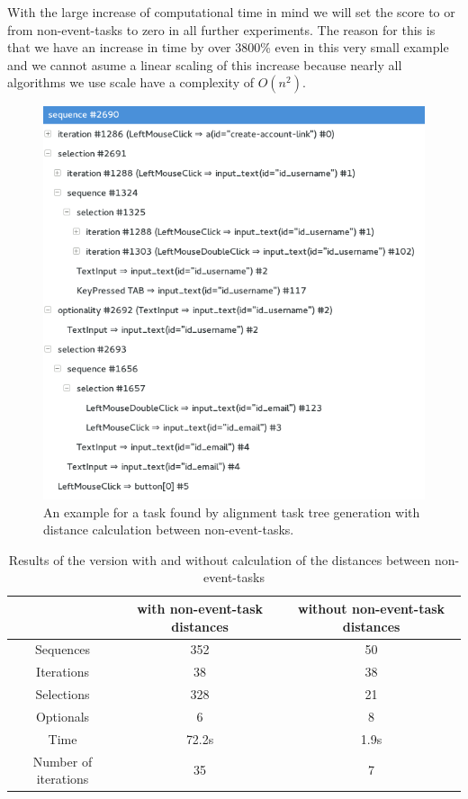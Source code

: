 With the large increase of computational time in mind we will set the score to or from non-event-tasks to zero in all further experiments.
The reason for this is that we have an increase in time by over 3800\% even in this very small example and we cannot asume a linear scaling of this increase because nearly all algorithms we use scale have a complexity of $O(n^2)$.

\begin{figure}[h]
	\centering
	\includegraphics[width=\textwidth]{chapters/casestudy/noneventcreateaccount.png}
	\caption{An example for a task found by alignment task tree generation with distance calculation between non-event-tasks.}
	\label{fig:noneventaccountcreation}
\end{figure}

\begin{table}[h]
	\centering
	\begin{tabular}{|c|c|c|}
		\hline
		& \textbf{with non-event-task distances}& \textbf{without non-event-task distances} \\
		\hline
		Sequences & 352 & 50 \\
		
		Iterations& 38  & 38 \\
		Selections& 328 & 21 \\
		Optionals & 6   & 8  \\
		\hline
		Time      &  72.2s & 1.9s \\
		Number of iterations & 35 & 7\\
		\hline
	\end{tabular}
	\caption{Results of the version with and without calculation of the distances between non-event-tasks}
	\label{tab:resultsnoneventtasks}
\end{table}



